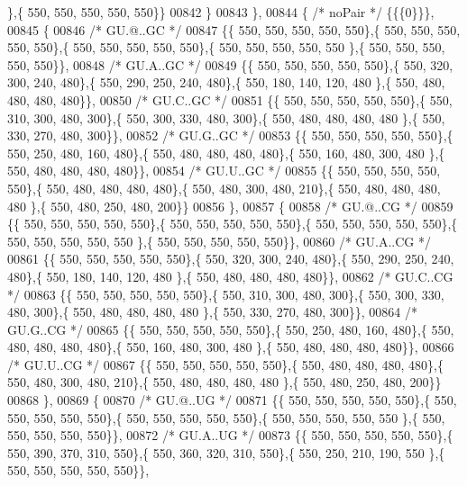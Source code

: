 \begin{DoxyCode}
      \},\{ 550, 550, 550, 550, 550\}\}
00842 \}
00843 \},
00844 \{ \textcolor{comment}{/* noPair */} \{\{\{0\}\}\},
00845 \{
00846 \textcolor{comment}{/* GU.@..GC */}
00847 \{\{ 550, 550, 550, 550, 550\},\{ 550, 550, 550, 550, 550\},\{ 550, 550, 550, 550, 550\},\{ 550, 550, 550, 550, 550
      \},\{ 550, 550, 550, 550, 550\}\},
00848 \textcolor{comment}{/* GU.A..GC */}
00849 \{\{ 550, 550, 550, 550, 550\},\{ 550, 320, 300, 240, 480\},\{ 550, 290, 250, 240, 480\},\{ 550, 180, 140, 120, 480
      \},\{ 550, 480, 480, 480, 480\}\},
00850 \textcolor{comment}{/* GU.C..GC */}
00851 \{\{ 550, 550, 550, 550, 550\},\{ 550, 310, 300, 480, 300\},\{ 550, 300, 330, 480, 300\},\{ 550, 480, 480, 480, 480
      \},\{ 550, 330, 270, 480, 300\}\},
00852 \textcolor{comment}{/* GU.G..GC */}
00853 \{\{ 550, 550, 550, 550, 550\},\{ 550, 250, 480, 160, 480\},\{ 550, 480, 480, 480, 480\},\{ 550, 160, 480, 300, 480
      \},\{ 550, 480, 480, 480, 480\}\},
00854 \textcolor{comment}{/* GU.U..GC */}
00855 \{\{ 550, 550, 550, 550, 550\},\{ 550, 480, 480, 480, 480\},\{ 550, 480, 300, 480, 210\},\{ 550, 480, 480, 480, 480
      \},\{ 550, 480, 250, 480, 200\}\}
00856 \},
00857 \{
00858 \textcolor{comment}{/* GU.@..CG */}
00859 \{\{ 550, 550, 550, 550, 550\},\{ 550, 550, 550, 550, 550\},\{ 550, 550, 550, 550, 550\},\{ 550, 550, 550, 550, 550
      \},\{ 550, 550, 550, 550, 550\}\},
00860 \textcolor{comment}{/* GU.A..CG */}
00861 \{\{ 550, 550, 550, 550, 550\},\{ 550, 320, 300, 240, 480\},\{ 550, 290, 250, 240, 480\},\{ 550, 180, 140, 120, 480
      \},\{ 550, 480, 480, 480, 480\}\},
00862 \textcolor{comment}{/* GU.C..CG */}
00863 \{\{ 550, 550, 550, 550, 550\},\{ 550, 310, 300, 480, 300\},\{ 550, 300, 330, 480, 300\},\{ 550, 480, 480, 480, 480
      \},\{ 550, 330, 270, 480, 300\}\},
00864 \textcolor{comment}{/* GU.G..CG */}
00865 \{\{ 550, 550, 550, 550, 550\},\{ 550, 250, 480, 160, 480\},\{ 550, 480, 480, 480, 480\},\{ 550, 160, 480, 300, 480
      \},\{ 550, 480, 480, 480, 480\}\},
00866 \textcolor{comment}{/* GU.U..CG */}
00867 \{\{ 550, 550, 550, 550, 550\},\{ 550, 480, 480, 480, 480\},\{ 550, 480, 300, 480, 210\},\{ 550, 480, 480, 480, 480
      \},\{ 550, 480, 250, 480, 200\}\}
00868 \},
00869 \{
00870 \textcolor{comment}{/* GU.@..UG */}
00871 \{\{ 550, 550, 550, 550, 550\},\{ 550, 550, 550, 550, 550\},\{ 550, 550, 550, 550, 550\},\{ 550, 550, 550, 550, 550
      \},\{ 550, 550, 550, 550, 550\}\},
00872 \textcolor{comment}{/* GU.A..UG */}
00873 \{\{ 550, 550, 550, 550, 550\},\{ 550, 390, 370, 310, 550\},\{ 550, 360, 320, 310, 550\},\{ 550, 250, 210, 190, 550
      \},\{ 550, 550, 550, 550, 550\}\},

\end{DoxyCode}
